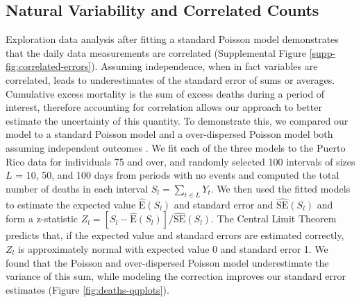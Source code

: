 \documentclass[11pt]{article}
\begin{document}
\subsection{Natural Variability and Correlated Counts}
\label{subsec:natural-variability}
Exploration data analysis after fitting a standard Poisson model demonstrates that the daily data measurements are correlated (Supplemental Figure \ref{supp-fig:correlated-errors}). Assuming independence, when in fact variables are correlated, leads to underestimates of the standard error of sums or averages. Cumulative excess mortality is the sum of excess deaths during a period of interest, therefore accounting for correlation allows our approach to better estimate the uncertainty of this quantity. To demonstrate this, we compared our model to a standard Poisson model and a over-dispersed Poisson model both assuming independent outcomes \cite{farrington1996statistical,hohle2008count,noufaily2013improved,salmon2016monitoring}. We fit each of the three models to the Puerto Rico data for individuals 75 and over, and randomly selected 100 intervals of sizes $L$ = 10, 50, and 100 days from periods with no events and computed the total number of deaths in each interval $S_l = \sum_{t \in L} Y_t$. We then used the fitted models to estimate the expected value $\hat{\mbox{E}}(S_l)$ and standard error  and $\hat{\mbox{SE}}(S_l)$ and form a z-statistic $Z_l = [S_l - \hat{\mbox{E}}(S_l)]/\hat{\mbox{SE}}(S_l)$. The Central Limit Theorem predicts that, if the expected value and standard errors are estimated correctly, $Z_l$ is approximately normal with expected value 0 and standard error 1. We found that the Poisson and over-dispersed Poisson model underestimate the variance of this sum, while modeling the correction improves our standard error estimates (Figure \ref{fig:deaths-qqplots}). 
 
\end{document}
